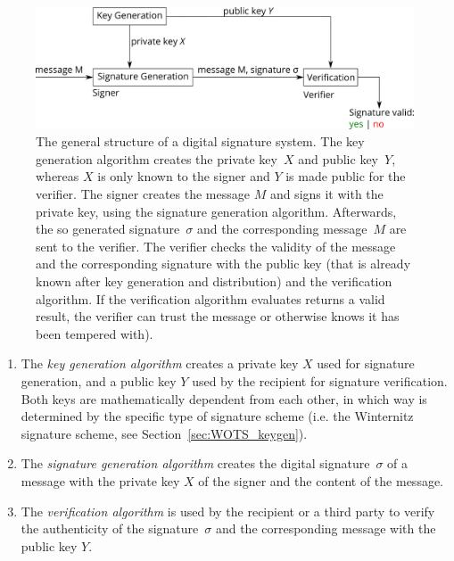 \begin{figure}
\centering
\includegraphics[width=\linewidth]{images/Background/Digital_Signaturesystem_Simple.png}
\caption{The general structure of a digital signature system. The key generation algorithm creates the private key~$X$ and public key~$Y$, whereas $X$ is only known to the signer and $Y$ is made public for the verifier. The signer creates the message $M$ and signs it with the private key, using the signature generation algorithm. Afterwards, the so generated signature~$\sigma$ and the corresponding message~$M$ are sent to the verifier. The verifier checks the validity of the message and the corresponding signature with the public key (that is already known after key generation and distribution) and the verification algorithm. If the verification algorithm evaluates returns a valid result, the verifier can trust the message or otherwise knows it has been tempered with).}
\label{img:digital_sign_system_simple}
\end{figure} 

\begin{enumerate}
\item The \textit{key generation algorithm} creates a private key $X$ used for signature generation, and a public key $Y$ used by the recipient for signature verification. Both keys are mathematically dependent from each other, in which way is determined by the specific type of signature scheme (i.e. the Winternitz signature scheme, see Section~\ref{sec:WOTS_keygen}). %
\item The \textit{signature generation algorithm} creates the digital signature~$\sigma$ of a message with the private key $X$ of the signer and the content of the message.
\item The \textit{verification algorithm} is used by the recipient or a third party to verify the authenticity of the signature~$\sigma$ and the corresponding message with the public key $Y$.
\end{enumerate}

